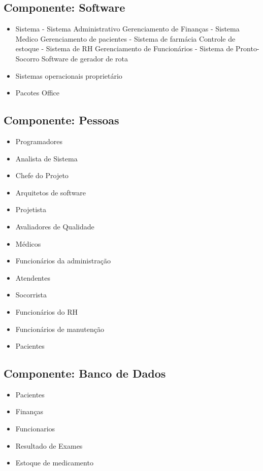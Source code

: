      \subsection{Componente: Software}
\begin{itemize}
\item Sistema
  \subitem - Sistema Administrativo
  \subsubitem * Gerenciamento de Finanças
  \subitem - Sistema Medico
  \subsubitem * Gerenciamento de pacientes
  \subitem - Sistema de farmácia
  \subsubitem * Controle de estoque
  \subitem - Sistema de RH
  \subsubitem * Gerenciamento de Funcionários
   \subitem - Sistema de Pronto-Socorro
  \subsubitem * Software de gerador de rota

  \item Sistemas operacionais proprietário
  \item Pacotes Office


\end{itemize}


     \subsection{Componente: Pessoas}


\begin{itemize}
\item Programadores
\item Analista de Sistema
\item Chefe do Projeto
\item Arquitetos de software
\item Projetista
\item Avaliadores de Qualidade
  \item   Médicos
  \item  Funcionários  da administração
  \item   Atendentes
  \item  Socorrista
  \item   Funcionários  do RH
  \item Funcionários de manutenção
  \item Pacientes
  \end{itemize}



     \subsection{Componente: Banco de Dados}
\begin{itemize}

  \item Pacientes
  \item Finanças
  \item Funcionarios
  \item Resultado de Exames
  \item Estoque de medicamento
  \end{itemize}


